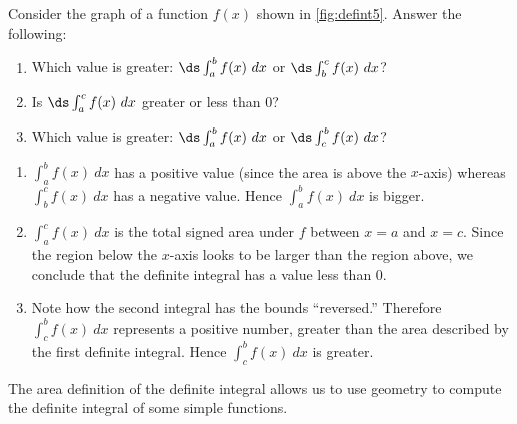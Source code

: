 {Consider the graph of a function $f(x)$ shown in \autoref{fig:defint5}. Answer the following:
%
%
\begin{enumerate}
	\item	Which value is greater: $\ds \int_a^b f(x)\ dx$ or $\ds \int_b^c f(x)\ dx$?
	\item	Is $\ds \int_a^c f(x)\ dx$ greater or less than 0?
	\item	Which value is greater: $\ds \int_a^b f(x)\ dx$ or $\ds \int_c^b f(x)\ dx$?
\end{enumerate}}
{\begin{enumerate}
	\item	$\int_a^b f(x)\ dx$ has a positive value (since the area is above the $x$-axis) whereas $\int_b^c f(x)\ dx$ has a negative value. Hence $\int_a^b f(x)\ dx$ is bigger.
	\item	$\int_a^c f(x)\ dx$ is the total signed area under $f$ between $x=a$ and $x=c$. Since the region below the $x$-axis looks to be larger than the region above, we conclude that the definite integral has a value less than 0.
	\item	Note how the second integral has the bounds ``reversed.'' Therefore $\int_c^b f(x)\ dx$ represents a positive number, greater than the area described by the first definite integral. Hence $\int_c^b f(x)\ dx$ is greater.\eoehere
\end{enumerate}}

The area definition of the definite integral allows us to use geometry to compute the definite integral of some simple functions.

